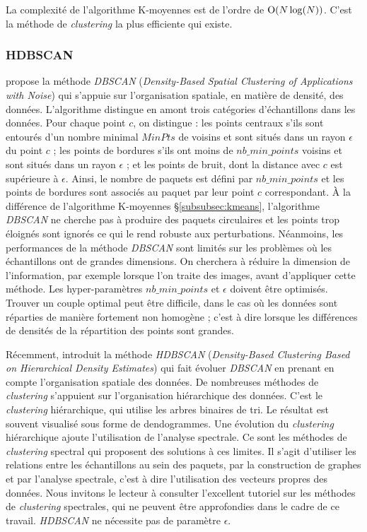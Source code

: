 La complexité de l'algorithme K-moyennes est de l'ordre de  $\operatorname{O}(N \log(N))$.
C'est la méthode de \textit{clustering} la plus efficiente qui existe.

\subsubsection{HDBSCAN} \label{subsubsec:hdbscan}
\cite{ester_densitybased_1996} propose la méthode \textit{DBSCAN} (\textit{Density-Based Spatial Clustering of Applications with Noise}) qui s'appuie sur l'organisation spatiale, en matière de densité, des données.
L'algorithme distingue en amont trois catégories d'échantillons dans les données.
Pour chaque point $c$, on distingue : les points centraux s'ils sont entourés d'un nombre minimal $MinPts$ de voisins et sont situés dans un rayon $\epsilon$ du point $c$ ; les points de bordures s'ils ont moins de $nb\_min\_points$ voisins et sont situés dans un rayon $\epsilon$ ; et les points de bruit, dont la distance avec $c$ est supérieure à $\epsilon$.
Ainsi, le nombre de paquets est défini par $nb\_min\_points$ et les points de bordures sont associés au paquet par leur point $c$ correspondant.
À la différence de l'algorithme K-moyennes §\ref{subsubsec:kmeans}, l'algorithme \textit{DBSCAN} ne cherche pas à produire des paquets circulaires et les points trop éloignés sont ignorés ce qui le rend robuste aux perturbations.
Néanmoins, les performances de la méthode \textit{DBSCAN} sont limités sur les problèmes où les échantillons ont de grandes dimensions. On cherchera à réduire la dimension de l'information, par exemple lorsque l'on traite des images, avant d'appliquer cette méthode.
Les hyper-paramètres $nb\_min\_points$ et $\epsilon$ doivent être optimisés. Trouver un couple optimal peut être difficile, dans le cas où les données sont réparties de manière fortement non homogène ; c'est à dire lorsque les différences de densités de la répartition des points sont grandes.

Récemment, \cite{campello_densitybased_2013} introduit la méthode \textit{HDBSCAN} (\textit{Density-Based Clustering Based on Hierarchical Density Estimates}) qui fait évoluer \textit{DBSCAN} en prenant en compte l'organisation spatiale des données.
De nombreuses méthodes de \textit{clustering} s'appuient sur l'organisation hiérarchique des données.
C'est le \textit{clustering} hiérarchique, qui utilise les arbres binaires de tri.
Le résultat est souvent visualisé sous forme de dendogrammes.
Une évolution du \textit{clustering} hiérarchique ajoute l'utilisation de l'analyse spectrale.
Ce sont les méthodes de \textit{clustering} spectral qui proposent des solutions à ces limites.
Il s'agit d'utiliser les relations entre les échantillons au sein des paquets, par la construction de graphes et par l'analyse spectrale, c'est à dire l'utilisation des vecteurs propres des données.
Nous invitons le lecteur à consulter l'excellent tutoriel \cite{vonluxburg_tutorial_2007} sur les méthodes de \textit{clustering} spectrales, qui ne peuvent être approfondies dans le cadre de ce travail.
\textit{HDBSCAN} ne nécessite pas de paramètre $\epsilon$.

